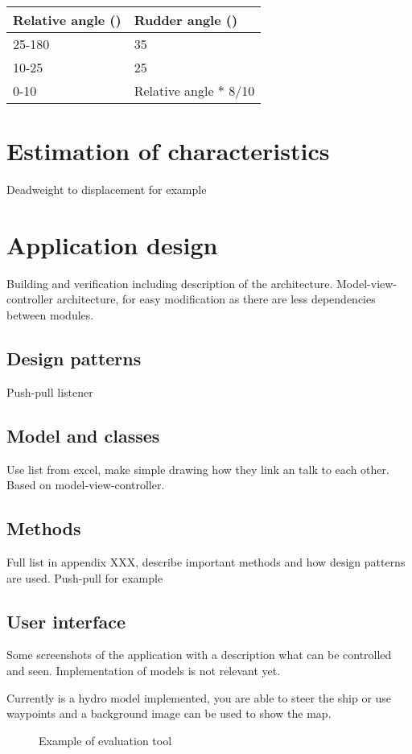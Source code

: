 \begin{table}[H]
	\centering
	\begin{tabular}{l|l}
		\toprule
		Relative angle (\degree) & Rudder angle (\degree) \\
		\midrule
		25-180 & 35\\
		10-25 & 25\\
		0-10 & Relative angle $*$ 8/10 \\
		\bottomrule
	\end{tabular}
	
	\label{tab:Rudder-angle}
\end{table}

\section{Estimation of characteristics}
Deadweight to displacement for example

\section{Application design}
Building and verification including description of the architecture. Model-view-controller architecture, for easy modification as there are less dependencies between modules.

\subsection{Design patterns}
Push-pull listener

\subsection{Model and classes}
Use list from excel, make simple drawing how they link an talk to each other. Based on model-view-controller.

\subsection{Methods}
Full list in appendix XXX, describe important methods and how design patterns are used. Push-pull for example

\subsection{User interface}
Some screenshots of the application with a description what can be controlled and seen. Implementation of models is not relevant yet.

Currently is a hydro model implemented, you are able to steer the ship or use waypoints and a background image can be used to show the map.

\begin{figure}[hb]
	\centering
	\caption{Example of evaluation tool}
	\label{fig:printscreen-tool}
\end{figure}


